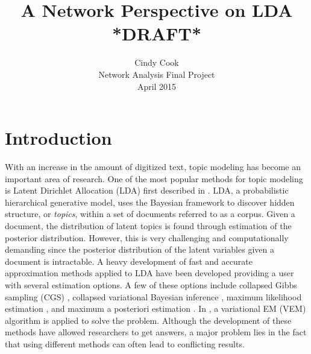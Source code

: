 \documentclass[12pt]{article}
\begin{document}
	\title{A Network Perspective on LDA *DRAFT*}
	\author{Cindy Cook \\ \normalsize Network Analysis Final Project \\ \normalsize April 2015}
	\date{}
	\maketitle

\section{Introduction}

With an increase in the amount of digitized text, topic modeling has become an important area of research. One of the most popular methods for topic modeling is Latent Dirichlet Allocation (LDA) first described in \cite{lda}. LDA, a probabilistic hierarchical generative model, uses the Bayesian framework to discover hidden structure, or \textit{topics},  within a set of documents referred to as a corpus. Given a document, the distribution of latent topics is found through estimation of the posterior distribution. However, this is very challenging and computationally demanding since the posterior distribution of the latent variables given a document is intractable. A heavy development of fast and accurate approximation methods applied to LDA have been developed providing a user with several estimation options. A few of these options include collapsed Gibbs sampling (CGS) \cite{CGS}, collapsed variational Bayesian inference \cite{CVB}, maximum likelihood estimation \cite{ML}, and maximum a posteriori estimation \cite{MAP}. In \cite{lda}, a variational EM (VEM) algorithm is applied to solve the problem. Although the development of these methods have allowed researchers to get answers, a major problem lies in the fact that using different methods can often lead to conflicting results.
\\
\\
\end{document}
